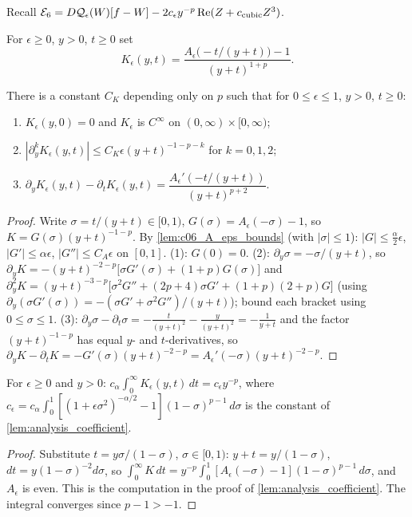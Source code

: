 Recall $\mathcal{E}_6=D\mathcal{Q}_\epsilon(W)[f-W]-2c_\epsilon y^{-p}\operatorname{Re}(Z+c_{\textup{cubic}}Z^3)$.

\begin{definition}
  \label{def:c06_wedge_kernel}
  For $\epsilon\ge0$, $y>0$, $t\ge0$ set
  \[K_\epsilon(y,t)=\frac{A_\epsilon\bigl(-t/(y+t)\bigr)-1}{(y+t)^{1+p}} .\]
\end{definition}

\begin{lemma}
  \label{lem:c06_wedge_kernel_bounds}
  There is a constant $C_K$ depending only on $p$ such that for $0\le\epsilon\le1$, $y>0$, $t\ge0$:
  \begin{enumerate}
    \item $K_\epsilon(y,0)=0$ and $K_\epsilon$ is $C^\infty$ on $(0,\infty)\times[0,\infty)$;
    \item $|\partial_y^kK_\epsilon(y,t)|\leq C_K\epsilon(y+t)^{-1-p-k}$ for $k=0,1,2$;
    \item $\partial_yK_\epsilon(y,t)-\partial_tK_\epsilon(y,t)=\dfrac{A_\epsilon'(-t/(y+t))}{(y+t)^{p+2}}$.
  \end{enumerate}
\end{lemma}
\begin{proof}
  Write $\sigma=t/(y+t)\in[0,1)$, $G(\sigma)=A_\epsilon(-\sigma)-1$, so $K=G(\sigma)(y+t)^{-1-p}$.
  By \cref{lem:c06_A_eps_bounds} (with $|\sigma|\le1$): $|G|\le\frac\alpha2\epsilon$, $|G'|\le\alpha\epsilon$,
  $|G''|\le C_A\epsilon$ on $[0,1]$. (1): $G(0)=0$. (2): $\partial_y\sigma=-\sigma/(y+t)$, so
  $\partial_yK=-(y+t)^{-2-p}\bigl[\sigma G'(\sigma)+(1+p)G(\sigma)\bigr]$ and
  $\partial_y^2K=(y+t)^{-3-p}\bigl[\sigma^2G''+(2p+4)\sigma G'+(1+p)(2+p)G\bigr]$ (using $\partial_y(\sigma G'(\sigma))=-(\sigma G'+\sigma^2G'')/(y+t)$);
  bound each bracket using $0\le\sigma\le1$.
  (3): $\partial_y\sigma-\partial_t\sigma=-\frac{t}{(y+t)^2}-\frac{y}{(y+t)^2}=-\frac1{y+t}$ and the factor
  $(y+t)^{-1-p}$ has equal $y$- and $t$-derivatives, so
  $\partial_yK-\partial_tK=-G'(\sigma)(y+t)^{-2-p}=A_\epsilon'(-\sigma)(y+t)^{-2-p}$.
\end{proof}

\begin{lemma}
  \label{lem:c06_wedge_kernel_mass}
  For $\epsilon\ge0$ and $y>0$: $c_\alpha\int_0^\infty K_\epsilon(y,t)\,dt=c_\epsilon y^{-p}$, where
  $c_\epsilon=c_\alpha\int_0^1[(1+\epsilon\sigma^2)^{-\alpha/2}-1](1-\sigma)^{p-1}\,d\sigma$ is the constant
  of \cref{lem:analysis_coefficient}.
\end{lemma}
\begin{proof}
  Substitute $t=y\sigma/(1-\sigma)$, $\sigma\in[0,1)$: $y+t=y/(1-\sigma)$, $dt=y(1-\sigma)^{-2}d\sigma$, so
  $\int_0^\infty K\,dt=y^{-p}\int_0^1[A_\epsilon(-\sigma)-1](1-\sigma)^{p-1}\,d\sigma$, and $A_\epsilon$ is even.
  This is the computation in the proof of \cref{lem:analysis_coefficient}. The integral converges
  since $p-1>-1$.
\end{proof}

